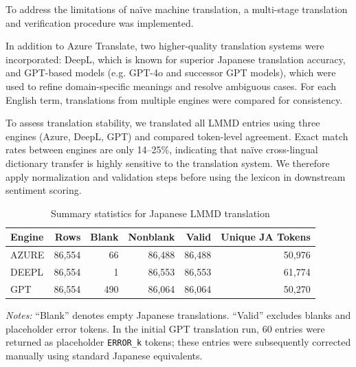 To address the limitations of naïve machine translation, a multi-stage translation and verification procedure was implemented.

In addition to Azure Translate, two higher-quality translation systems were incorporated: 
DeepL, which is known for superior Japanese translation accuracy, and GPT-based models (e.g. GPT-4o and successor GPT models), which were used to refine domain-specific meanings and resolve ambiguous cases. 
For each English term, translations from multiple engines were compared for consistency.

To assess translation stability, we translated all LMMD entries using three engines (Azure, DeepL, GPT) and compared token-level agreement. Exact match rates between engines are only 14–25\%, indicating that naïve cross-lingual dictionary transfer is highly sensitive to the translation system. We therefore apply normalization and validation steps before using the lexicon in downstream sentiment scoring.

\begin{table}[htbp]
\centering
\small
\caption{Summary statistics for Japanese LMMD translation}
\label{tab:lmmd_translation_summary}
\begin{tabular}{lrrrrr}
\toprule
\textbf{Engine} & \textbf{Rows} & \textbf{Blank} & \textbf{Nonblank} & \textbf{Valid} & \textbf{Unique JA Tokens} \\
\midrule
AZURE & 86,554 & 66  & 86,488 & 86,488 & 50,976 \\
DEEPL & 86,554 & 1   & 86,553 & 86,553 & 61,774 \\
GPT   & 86,554 & 490 & 86,064 & 86,064 & 50,270 \\
\bottomrule
\end{tabular}

\vspace{4pt}
\begin{minipage}{0.95\linewidth}
\footnotesize
\emph{Notes:} “Blank” denotes empty Japanese translations. “Valid” excludes blanks and placeholder error tokens. In the initial GPT translation run, 60 entries were returned as placeholder \texttt{ERROR\_k} tokens; these entries were subsequently corrected manually using standard Japanese equivalents.
\end{minipage}
\end{table}

